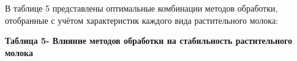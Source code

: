 В таблице 5 представлены оптимальные комбинации методов обработки,
отобранные с учётом характеристик каждого вида растительного молока:

{\bfseries Таблица 5- Влияние методов обработки на стабильность
растительного молока}


